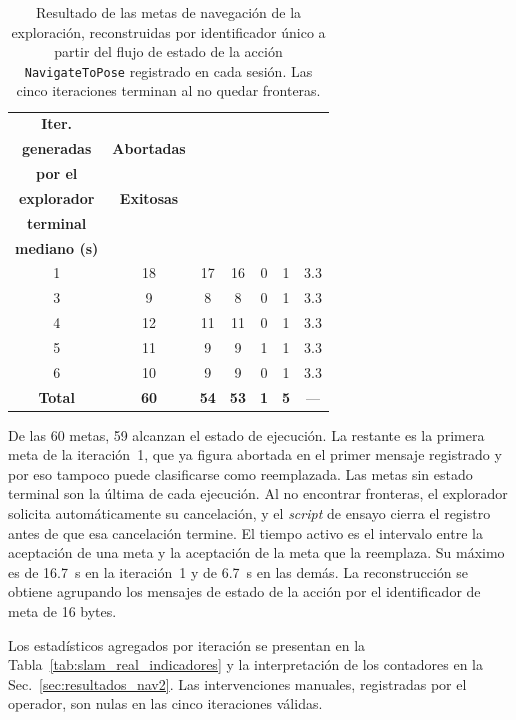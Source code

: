 \begin{appendices}
\begin{table}[H]
\centering
\caption{Resultado de las metas de navegación de la exploración, reconstruidas por identificador único a partir del flujo de estado de la acción \texttt{NavigateToPose} registrado en cada sesión. Las cinco iteraciones terminan al no quedar fronteras.}
\label{tab:anx_explore_metas}
\footnotesize
\setlength{\tabcolsep}{4pt}
\begin{tabular}{ccccccc}
\toprule
\textbf{Iter.} & \makecell{\textbf{Metas}\\\textbf{generadas}} & \textbf{Abortadas} & \makecell{\textbf{Reemplazadas}\\\textbf{por el}\\\textbf{explorador}} & \textbf{Exitosas} & \makecell{\textbf{Sin estado}\\\textbf{terminal}} & \makecell{\textbf{Tiempo activo}\\\textbf{mediano (s)}} \\
\midrule
1 & 18 & 17 & 16 & 0 & 1 & 3.3 \\
3 & 9  & 8  & 8  & 0 & 1 & 3.3 \\
4 & 12 & 11 & 11 & 0 & 1 & 3.3 \\
5 & 11 & 9  & 9  & 1 & 1 & 3.3 \\
6 & 10 & 9  & 9  & 0 & 1 & 3.3 \\
\midrule
\textbf{Total} & \textbf{60} & \textbf{54} & \textbf{53} & \textbf{1} & \textbf{5} & --- \\
\bottomrule
\end{tabular}
\end{table}

\noindent De las 60 metas, 59 alcanzan el estado de ejecución. La restante es
la primera meta de la iteración~1, que ya figura abortada en el primer mensaje
registrado y por eso tampoco puede clasificarse como reemplazada. Las metas sin
estado terminal son la última de cada ejecución. Al no encontrar fronteras, el
explorador solicita automáticamente su cancelación, y el \textit{script} de ensayo cierra
el registro antes de que esa cancelación termine. El tiempo activo es el
intervalo entre la aceptación de una meta y la aceptación de la meta que la
reemplaza. Su máximo es de 16.7~s en la iteración~1 y de 6.7~s en las demás.
La reconstrucción se obtiene agrupando los mensajes de estado de la acción por el
identificador de meta de 16 bytes.

Los estadísticos agregados por iteración se presentan en la Tabla~\ref{tab:slam_real_indicadores} y la interpretación de los contadores en la Sec.~\ref{sec:resultados_nav2}. Las intervenciones manuales, registradas por el operador, son nulas en las cinco iteraciones válidas.


\end{appendices}
